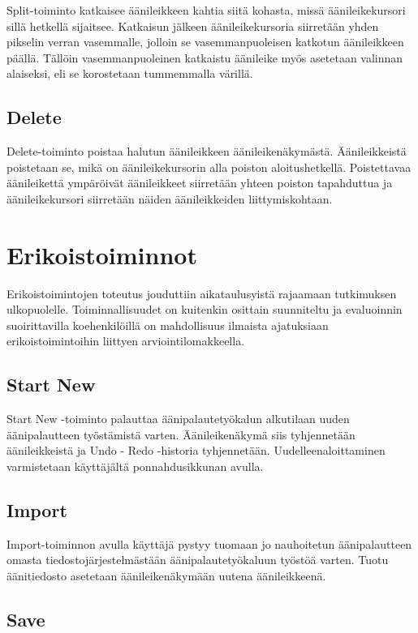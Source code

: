 \documentclass[utf8]{gradu3}
\begin{document}
Split-toiminto katkaisee äänileikkeen kahtia siitä kohasta, missä äänileikekursori sillä hetkellä sijaitsee. Katkaisun jälkeen äänileikekursoria siirretään yhden pikselin verran vasemmalle, jolloin se vasemmanpuoleisen katkotun äänileikkeen päällä. Tällöin vasemmanpuoleinen katkaistu äänileike myös asetetaan valinnan alaiseksi, eli se korostetaan tummemmalla värillä.

\subsection{Delete}

Delete-toiminto poistaa halutun äänileikkeen äänileikenäkymästä. Äänileikkeistä poistetaan se, mikä on äänileikekursorin alla poiston aloitushetkellä. Poistettavaa äänileikettä ympäröivät äänileikkeet siirretään yhteen poiston tapahduttua ja äänileikekursori siirretään näiden äänileikkeiden liittymiskohtaan.

\section{Erikoistoiminnot}

Erikoistoimintojen toteutus jouduttiin aikataulusyistä rajaamaan tutkimuksen ulkopuolelle. Toiminnallisuudet on kuitenkin osittain suunniteltu ja evaluoinnin suoirittavilla koehenkilöillä on mahdollisuus ilmaista ajatuksiaan erikoistoimintoihin liittyen arviointilomakkeella. 

\subsection{Start New}

Start New -toiminto palauttaa äänipalautetyökalun alkutilaan uuden äänipalautteen työstämistä varten. Äänileikenäkymä siis tyhjennetään äänileikkeistä ja Undo - Redo -historia tyhjennetään. Uudelleenaloittaminen varmistetaan käyttäjältä ponnahdusikkunan avulla.

\subsection{Import}

Import-toiminnon avulla käyttäjä pystyy tuomaan jo nauhoitetun äänipalautteen omasta tiedostojärjestelmästään äänipalautetyökaluun työstöä varten. Tuotu äänitiedosto asetetaan äänileikenäkymään uutena äänileikkeenä. 

\subsection{Save}
\end{document}
